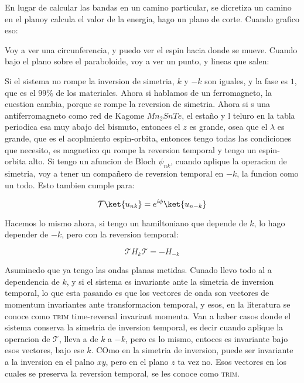 \documentclass[11pt,fleqn]{book}
\begin{document}
En lugar de calcular las bandas en un camino particular, se dicretiza un camino en el planoy calcula el valor de la energia, hago un plano de corte. Cuando grafico eso:


Voy a ver una circunferencia, y puedo ver el espin hacia donde se mueve. Cuando bajo el plano sobre el paraboloide, voy a ver un punto, y lineas que salen:


Si el sistema no rompe la inversion de simetria, $k$ y $-k$ son iguales, y la fase es $1$, que es el $99\%$ de los materiales. Ahora si hablamos de un ferromagneto, la cuestion cambia, porque se rompe la reversion de simetria. Ahora si s una antiferromagneto como red de Kagome $Mn_{2}SnTe$, el estaño y l teluro en la tabla periodica esa muy abajo del bismuto, entonces el $z$ es grande, osea que el $\lambda$ es grande, que es el acoplmiento espin-orbita, entonces tengo todas las condiciones que necesito, es magnetico qu rompe la reversion temporal y tengo un espin-orbita alto. Si tengo un afuncion de Bloch $\psi_{nk}$, cuando aplique la operacion de simetria, voy a tener un compañero de reversion temporal en $-k$, la funcion como un todo. Esto tambien cumple para:

\begin{equation}
    \mathcal{T}\ket{u_{nk}}=e^{i\phi}\ket{u_{n-k}}
\end{equation}

Hacemos lo mismo ahora, si tengo un hamiltoniano que depende de $k$, lo hago depender de $-k$, pero con la reversion temporal:

\begin{equation}
    \mathcal{T}H_{k}\mathcal{T}=-H_{-k}
\end{equation}

Asuminedo que ya tengo las ondas planas metidas. Cunado llevo todo al a dependencia de $k$, y si el sistema es invariante ante la simetria de inversion temporal, lo que esta pasando es que los vectores de onda son vectores de momentum invariantes ante transformacion temporal, y esos, en la literatura se conoce como \textsc{trim} time-reversal invariant momenta. Van a haber casos donde el sistema conserva la simetria de inversion temporal, es decir cuando aplique la operacion de $\mathcal{T}$, lleva a de $k$ a $-k$, pero es lo mismo, entoces es invariante bajo esos vectores, bajo ese $k$. COmo en la simetria de inversion, puede ser invariante a la inversion en el palno $xy$, pero en el plano $z$ ta vez no. Esos vectores en los cuales se preserva la reversion temporal, se les conoce como \textsc{trim}. 
\end{document}
